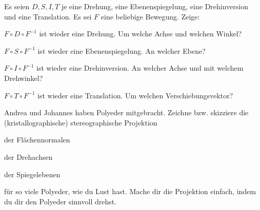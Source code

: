 \begin{sheet}
\begin{problem}[title={Konjugation geometrisch}, difficulty={mittel}]
Es seien $D,S,I,T$ je eine Drehung, eine Ebenenspiegelung, eine Drehinversion und eine Translation. Es sei $F$ eine beliebige Bewegung. Zeige:
\begin{subproblem}
$F\circ D\circ F^{-1}$ ist wieder eine Drehung. Um welche Achse und welchen Winkel?
\end{subproblem}
\begin{subproblem}
$F\circ S\circ F^{-1}$ ist wieder eine Ebenenspiegelung. An welcher Ebene?
\end{subproblem}
\begin{subproblem}
$F\circ I\circ F^{-1}$ ist wieder eine Drehinversion. An welcher Achse und mit welchem Drehwinkel?
\end{subproblem}
\begin{subproblem}
$F\circ T\circ F^{-1}$ ist wieder eine Translation. Um welchen Verschiebungsvektor?
\end{subproblem}
\end{problem}

\begin{problem}
	Andrea und Johannes haben Polyeder mitgebracht. Zeichne bzw. skizziere die (kristallographische) stereographische Projektion
	\begin{subproblem}
		der Flächennormalen
	\end{subproblem}
	\begin{subproblem}
		der Drehachsen
	\end{subproblem}
	\begin{subproblem}
		der Spiegelebenen
	\end{subproblem}
	für so viele Polyeder, wie du Lust hast. Mache dir die Projektion einfach, indem du dir den Polyeder sinnvoll drehst. 
\end{problem}

\end{sheet}